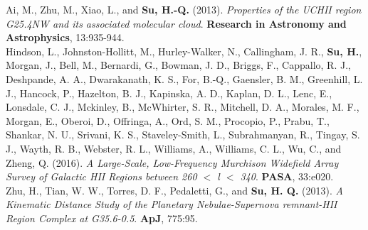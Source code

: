 \documentclass[a4paper,12pt]{memoir} %
\begin{document}
{%
Ai, M., Zhu, M., Xiao, L., and \textbf{Su, H.-Q.} (2013). \textit{Properties of the UCHII 
region G25.4NW and its associated molecular cloud}. \textbf{Research in Astronomy and Astrophysics}, 13:935-944.
\\

Hindson, L., Johnston-Hollitt, M., Hurley-Walker, N., Callingham, J. R., \textbf{Su, H.}, Morgan, J., Bell, M., Bernardi, G., Bowman, J. D., Briggs, F., Cappallo,
R. J., Deshpande, A. A., Dwarakanath, K. S., For, B.-Q., Gaensler, B. M., Greenhill, L. J., Hancock, P., Hazelton, B. J., Kapinska, A. D., Kaplan,
D. L., Lenc, E., Lonsdale, C. J., Mckinley, B., McWhirter, S. R., Mitchell,
D. A., Morales, M. F., Morgan, E., Oberoi, D., Offringa, A., Ord, S. M.,
Procopio, P., Prabu, T., Shankar, N. U., Srivani, K. S., Staveley-Smith, L.,
Subrahmanyan, R., Tingay, S. J., Wayth, R. B., Webster, R. L., Williams, A.,
Williams, C. L., Wu, C., and Zheng, Q. (2016). \textit{A Large-Scale, Low-Frequency
Murchison Widefield Array Survey of Galactic HII Regions between 260 $<$ l $<$ 340}. \textbf{PASA}, 33:e020.
\\

Zhu, H., Tian, W. W., Torres, D. F., Pedaletti, G., and \textbf{Su, H. Q.} (2013). \textit{A Kinematic Distance Study of the Planetary Nebulae-Supernova remnant-HII Region Complex at G35.6-0.5}. \textbf{ApJ}, 775:95.
\\
}
\end{document}
